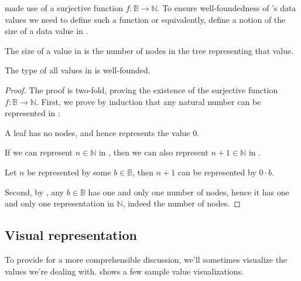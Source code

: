  made use of a surjective function $f :
\mathbb{B}\rightarrow\mathbb{N}$. To ensure well-foundedness of \D{}'s data
values we need to define such a function or equivalently, define a notion of
the size of a data value in \D{}.

\begin{definition}\label{definition:size} The size of a value in \D{} is the
number of nodes in the tree representing that value.\end{definition}

\begin{theorem}\label{theorem:type-is-well-founded} The type of all values in
\D{} is well-founded.\end{theorem}

\begin{proof} The proof is two-fold, proving the existence of the surjective
function $f:\mathbb{B}\rightarrow\mathbb{N}$. First, we prove by induction that
any natural number can be represented in \D{}:

\begin{description}[\setleftmargin{70pt}\setlabelstyle{\bf}]

\item [Base case] A leaf has no nodes, and hence represents the value $0$.

\item [Assumption] If we can represent $n\in\mathbb{N}$ in \D{}, then we can
also represent $n+1\in\mathbb{N}$ in \D{}. 

\item [Induction] Let $n$ be represented by some $b\in\mathbb{B}$, then $n+1$
can be represented by $0\cdot b$. 

\end{description}

Second, by , any $b\in\mathbb{B}$ has one and only
one number of nodes, hence it has one and only one representation in
$\mathbb{N}$, indeed the number of nodes.\end{proof}

\subsection{Visual representation}

To provide for a more comprehensible discussion, we'll sometimes visualize the
values we're dealing with.  shows a few
sample value visualizations.

